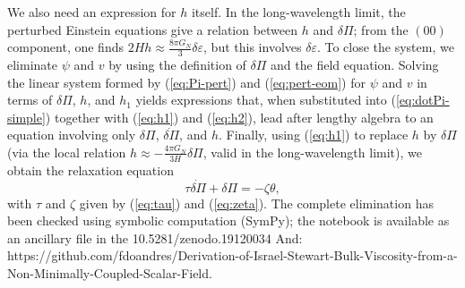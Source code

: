 \documentclass[aps,prd,reprint,superscriptaddress,floatfix]{revtex4-2}
\begin{document}
We also need an expression for $h$ itself. In the long-wavelength limit, the perturbed Einstein equations give a relation between $h$ and $\delta\Pi$; from the $(00)$ component, one finds $2H h \approx \frac{8\pi G_N}{3} \delta\varepsilon$, but this involves $\delta\varepsilon$. To close the system, we eliminate $\psi$ and $v$ by using the definition of $\delta\Pi$ and the field equation. Solving the linear system formed by (\ref{eq:Pi-pert}) and (\ref{eq:pert-eom}) for $\psi$ and $v$ in terms of $\delta\Pi$, $h$, and $h_1$ yields expressions that, when substituted into (\ref{eq:dotPi-simple}) together with (\ref{eq:h1}) and (\ref{eq:h2}), lead after lengthy algebra to an equation involving only $\delta\Pi$, $\dot{\delta\Pi}$, and $h$. Finally, using (\ref{eq:h1}) to replace $h$ by $\delta\Pi$ (via the local relation $h \approx -\frac{4\pi G_N}{3H}\delta\Pi$, valid in the long-wavelength limit), we obtain the relaxation equation
\begin{equation}
\tau \dot{\delta\Pi} + \delta\Pi = -\zeta \theta,
\end{equation}
with $\tau$ and $\zeta$ given by (\ref{eq:tau}) and (\ref{eq:zeta}). The complete elimination has been checked using symbolic computation (SymPy); the notebook is available as an ancillary file in the 10.5281/zenodo.19120034 And: https://github.com/fdoandres/Derivation-of-Israel-Stewart-Bulk-Viscosity-from-a-Non-Minimally-Coupled-Scalar-Field.

\end{document}
